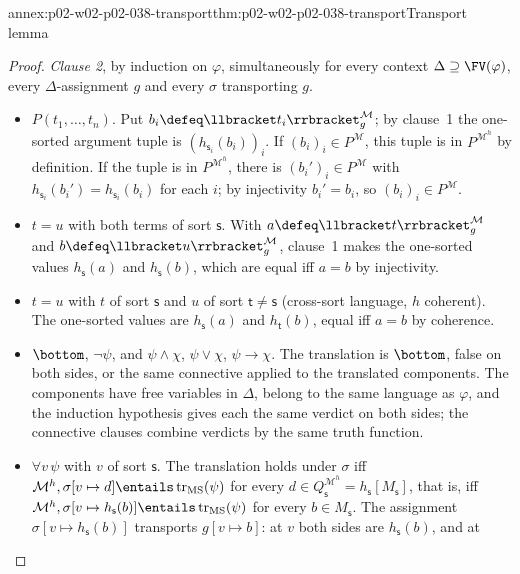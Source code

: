 \begin{annexitem}{annex:p02-w02-p02-038-transport}{thm:p02-w02-p02-038-transport}{Transport lemma}
\begin{proof}
\emph{Clause 2}, by induction on \(\varphi\), simultaneously for every
context \(\Delta\supseteq\FV(\varphi)\), every \(\Delta\)-assignment \(g\) and
every \(\sigma\) transporting \(g\).
\begin{itemize}
\item \(P(t_1,\ldots,t_n)\).  Put
      \(b_i\defeq\llbracket t_i\rrbracket^{\mathcal M}_{g}\); by clause~1 the
      one-sorted argument tuple is \((h_{\mathsf s_i}(b_i))_i\).  If
      \((b_i)_i\in P^{\mathcal M}\), this tuple is in \(P^{\mathcal M^{h}}\)
      by definition.  If the tuple is in \(P^{\mathcal M^{h}}\), there is
      \((b_i')_i\in P^{\mathcal M}\) with
      \(h_{\mathsf s_i}(b_i')=h_{\mathsf s_i}(b_i)\) for each \(i\); by
      injectivity \(b_i'=b_i\), so \((b_i)_i\in P^{\mathcal M}\).
\item \(t=u\) with both terms of sort \(\mathsf s\).  With
      \(a\defeq\llbracket t\rrbracket^{\mathcal M}_{g}\) and
      \(b\defeq\llbracket u\rrbracket^{\mathcal M}_{g}\), clause~1 makes the
      one-sorted values \(h_{\mathsf s}(a)\) and \(h_{\mathsf s}(b)\), which
      are equal iff \(a=b\) by injectivity.
\item \(t=u\) with \(t\) of sort \(\mathsf s\) and \(u\) of sort
      \(\mathsf t\ne\mathsf s\) (cross-sort language, \(h\) coherent).  The
      one-sorted values are \(h_{\mathsf s}(a)\) and \(h_{\mathsf t}(b)\),
      equal iff \(a=b\) by coherence.
\item \(\bottom\), \(\neg\psi\), and \(\psi\land\chi\), \(\psi\lor\chi\),
      \(\psi\to\chi\).  The translation is \(\bottom\), false on both sides,
      or the same connective applied to the translated components.  The
      components have free variables in \(\Delta\), belong to the same
      language as \(\varphi\), and the induction hypothesis gives each the
      same verdict on both sides; the connective clauses combine verdicts by
      the same truth function.
\item \(\forall v\,\psi\) with \(v\) of sort \(\mathsf s\).  The translation
      holds under \(\sigma\) iff
      \(\mathcal M^{h},\sigma[v\mapsto d]\entails\operatorname{tr}_{\mathrm{MS}}(\psi)\)
      for every \(d\in Q_{\mathsf s}^{\mathcal M^{h}}=h_{\mathsf s}[M_{\mathsf s}]\),
      that is, iff
      \(\mathcal M^{h},\sigma[v\mapsto h_{\mathsf s}(b)]\entails
      \operatorname{tr}_{\mathrm{MS}}(\psi)\) for every \(b\in M_{\mathsf s}\).
      The assignment \(\sigma[v\mapsto h_{\mathsf s}(b)]\) transports
      \(g[v\mapsto b]\): at \(v\) both sides are \(h_{\mathsf s}(b)\), and at

\end{itemize}
\end{proof}
\end{annexitem}

